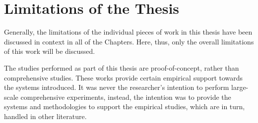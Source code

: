 \section{Limitations of the Thesis}

Generally, the limitations of the individual pieces of work in this thesis have been discussed in context in all of the Chapters. Here, thus, only the overall limitations of this work will be discussed.

The studies performed as part of this thesis are proof-of-concept, rather than comprehensive studies. These works provide certain empirical support towards the systems introduced. It was never the researcher's intention to perform large-scale comprehensive experiments, instead, the intention was to provide the systems and methodologies to support the empirical studies, which are in turn, handled in other literature.
 

